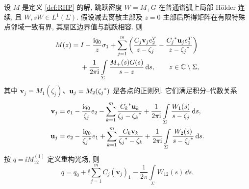 \begin{proposition}\label{prop:cauchy-representation}
设 $M$ 是定义 \ref{def:RHP} 的解, 跳跃密度 $W=M_+G$ 在普通谱弧上局部 Hölder 连续, 且 $W,sW\in L^1(\Sigma)$. 假设减去离散主部及 $z=0$ 主部后所得矩阵在有限特殊点邻域一致有界, 其扇区边界值与跳跃相容. 则
\begin{equation}\label{eq:general-cauchy}
\begin{aligned}
M(z)={}&I-\dfrac{\mathrm{i} q_0}{z}\sigma_1
+\sum\limits_{j=1}^{m}\left(
\dfrac{C_j\mathbf v_je_2^T}{z-\zeta_j}
-\dfrac{{C_j}^{*}\mathbf u_je_1^T}{z-{\zeta_j}^{*}}\right)\\
&+\dfrac{1}{2\pi\mathrm{i}}\int\limits_\Sigma\dfrac{M_+(s)G(s)}{s-z}\,\mathrm{d} s,
\qquad z\in\mathbb C\mathbin{\backslash}\Sigma,
\end{aligned}
\end{equation}
其中 $\mathbf v_j=M_1(\zeta_j)$、$\mathbf u_j=M_2({\zeta_j}^{*})$ 是各点的正则列. 它们满足积分--代数关系
\begin{align}
\mathbf v_j={}&e_1-\dfrac{\mathrm{i} q_0}{\zeta_j}e_2
-\sum\limits_{k=1}^{m}\dfrac{{C_k}^{*}\mathbf u_k}{\zeta_j-{\zeta_k}^{*}}
+\dfrac{1}{2\pi\mathrm{i}}\int\limits_\Sigma\dfrac{W_1(s)}{s-\zeta_j}\,\mathrm{d} s,
\label{eq:general-finite1}\\
\mathbf u_j={}&e_2-\dfrac{\mathrm{i} q_0}{{\zeta_j}^{*}}e_1
+\sum\limits_{k=1}^{m}\dfrac{C_k\mathbf v_k}{{\zeta_j}^{*}-\zeta_k}
+\dfrac{1}{2\pi\mathrm{i}}\int\limits_\Sigma\dfrac{W_2(s)}{s-{\zeta_j}^{*}}\,\mathrm{d} s.
\label{eq:general-finite2}
\end{align}
按 $q=\ii M^{(1)}_{12}$ 定义重构光场, 则
\begin{equation}\label{eq:qgeneral}
q=q_0+\ii\sum\limits_{j=1}^{m}C_j(\mathbf v_j)_1
-\dfrac{1}{2\pi}\int\limits_\Sigma W_{12}(s)\,\dd s.
\end{equation}
\end{proposition}

